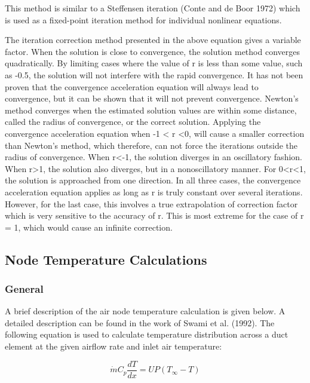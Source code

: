 This method is similar to a Steffensen iteration (Conte and de Boor 1972) which is used as a fixed-point iteration method for individual nonlinear equations.

The iteration correction method presented in the above equation gives a variable factor. When the solution is close to convergence, the solution method converges quadratically. By limiting cases where the value of r is less than some value, such as -0.5, the solution will not interfere with the rapid convergence. It has not been proven that the convergence acceleration equation will always lead to convergence, but it can be shown that it will not prevent convergence. Newton's method converges when the estimated solution values are within some distance, called the radius of convergence, or the correct solution. Applying the convergence acceleration equation when -1 \textless{} r \textless{}0, will cause a smaller correction than Newton's method, which therefore, can not force the iterations outside the radius of convergence. When r\textless{}-1, the solution diverges in an oscillatory fashion. When r\textgreater{}1, the solution also diverges, but in a nonoscillatory manner. For 0\textless{}r\textless{}1, the solution is approached from one direction. In all three cases, the convergence acceleration equation applies as long as r is truly constant over several iterations. However, for the last case, this involves a true extrapolation of correction factor which is very sensitive to the accuracy of r. This is most extreme for the case of r = 1, which would cause an infinite correction.

\subsection{Node Temperature Calculations}\label{node-temperature-calculations}

\subsubsection{General}

A brief description of the air node temperature calculation is given below. A detailed description can be found in the work of Swami et al. (1992). The following equation is used to calculate temperature distribution across a duct element at the given airflow rate and inlet air temperature:

\begin{equation}
\dot{m} C_p \frac{dT}{dx} = UP(T_\infty  - T)
\end{equation}

